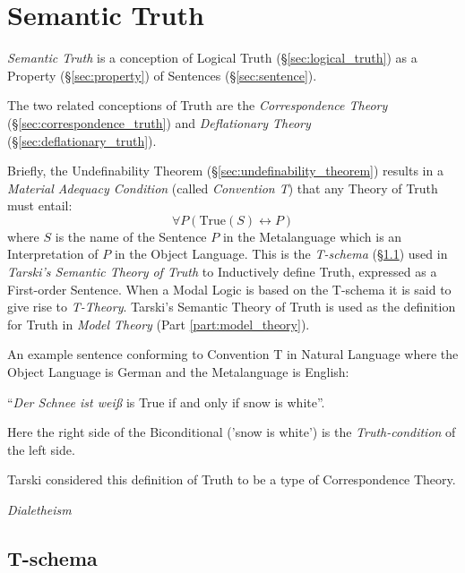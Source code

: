 \section{Semantic Truth}\label{sec:semantic_truth}

\emph{Semantic Truth} is a conception of Logical Truth
(\S\ref{sec:logical_truth}) as a Property (\S\ref{sec:property}) of
Sentences (\S\ref{sec:sentence}).

The two related conceptions of Truth are the \emph{Correspondence
  Theory} (\S\ref{sec:correspondence_truth}) and \emph{Deflationary
  Theory} (\S\ref{sec:deflationary_truth}).

Briefly, the Undefinability Theorem
(\S\ref{sec:undefinability_theorem}) results in a \emph{Material
  Adequacy Condition} (called \emph{Convention T}) that any Theory of
Truth must entail:
\[
    \forall P (\mathrm{True}(S) \leftrightarrow P)
\]
where $S$ is the name of the Sentence $P$ in the Metalanguage which is
an Interpretation of $P$ in the Object Language. This is the
\emph{T-schema} (\S\ref{sec:t_schema}) used in \emph{Tarski's Semantic
  Theory of Truth} to Inductively define Truth, expressed as a
First-order Sentence. When a Modal Logic is based on the T-schema it
is said to give rise to \emph{T-Theory}. Tarski's Semantic Theory of
Truth is used as the definition for Truth in \emph{Model Theory}
(Part \ref{part:model_theory}).

An example sentence conforming to Convention T in Natural Language
where the Object Language is German and the Metalanguage is English:
\begin{description}
  \item ``\emph{Der Schnee ist wei\ss} is True if and only if snow is
    white''.
\end{description}
Here the right side of the Biconditional ('snow is white') is the
\emph{Truth-condition} of the left side.

Tarski considered this definition of Truth to be a type of
Correspondence Theory.

\emph{Dialetheism}



\subsection{T-schema}\label{sec:t_schema}

